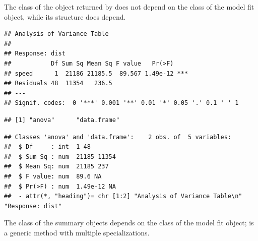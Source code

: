 \documentclass[krantz2]{krantz}\usepackage{knitr}
\begin{document}
\begin{explainbox}
The class of the object returned by  does not depend on the class of the model fit object, while its structure does depend.

\begin{knitrout}\footnotesize
{}\color{fgcolor}\begin{kframe}
\begin{alltt}
\end{alltt}
\begin{verbatim}
## Analysis of Variance Table
## 
## Response: dist
##           Df Sum Sq Mean Sq F value   Pr(>F)    
## speed      1  21186 21185.5  89.567 1.49e-12 ***
## Residuals 48  11354   236.5                     
## ---
## Signif. codes:  0 '***' 0.001 '**' 0.01 '*' 0.05 '.' 0.1 ' ' 1
\end{verbatim}
\end{kframe}
\end{knitrout}

\begin{knitrout}\footnotesize
{}\color{fgcolor}\begin{kframe}
\begin{alltt}
\hlstd{(}
\end{alltt}
\begin{verbatim}
## [1] "anova"      "data.frame"
\end{verbatim}
\end{kframe}
\end{knitrout}

\begin{knitrout}\footnotesize
{}\color{fgcolor}\begin{kframe}
\begin{alltt}
\hlstd{(}
\end{alltt}
\begin{verbatim}
## Classes 'anova' and 'data.frame':	2 obs. of  5 variables:
##  $ Df     : int  1 48
##  $ Sum Sq : num  21185 11354
##  $ Mean Sq: num  21185 237
##  $ F value: num  89.6 NA
##  $ Pr(>F) : num  1.49e-12 NA
##  - attr(*, "heading")= chr [1:2] "Analysis of Variance Table\n" "Response: dist"
\end{verbatim}
\end{kframe}
\end{knitrout}

The class of the summary objects depends on the class of the model fit object;  is a generic method with multiple specializations.


\end{explainbox}
\end{document}
